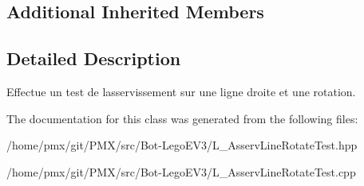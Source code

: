 \subsection*{Additional Inherited Members}


\subsection{Detailed Description}
Effectue un test de l\textquotesingle{}asservissement sur une ligne droite et une rotation. 

The documentation for this class was generated from the following files\+:\begin{DoxyCompactItemize}
\item 
/home/pmx/git/\+P\+M\+X/src/\+Bot-\/\+Lego\+E\+V3/L\+\_\+\+Asserv\+Line\+Rotate\+Test.\+hpp\item 
/home/pmx/git/\+P\+M\+X/src/\+Bot-\/\+Lego\+E\+V3/L\+\_\+\+Asserv\+Line\+Rotate\+Test.\+cpp\end{DoxyCompactItemize}
